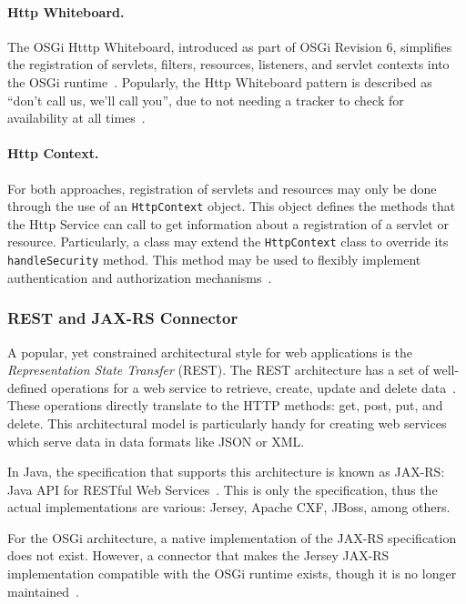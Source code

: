 \documentclass[12pt]{article}
\begin{document}
\paragraph{Http Whiteboard.} The OSGi Htttp Whiteboard, introduced as part of OSGi Revision 6, simplifies the registration of servlets, filters, resources, listeners, and servlet contexts into the OSGi runtime~\cite{httpwhiteboard_01}. Popularly, the Http Whiteboard pattern is described as ``don't call us, we'll call you'', due to not needing a tracker to check for availability at all times~\cite{httpwhiteboard_02}.

\paragraph{Http Context.} For both approaches, registration of servlets and resources may only be done through the use of an \texttt{HttpContext} object. This object defines the methods that the Http Service can call to get information about a registration of a servlet or resource.  Particularly, a class may extend the \texttt{HttpContext} class to override its \texttt{handleSecurity} method. This method may be used to flexibly implement authentication and authorization mechanisms~\cite{httpcontext}.

\subsubsection{REST and JAX-RS Connector}

A popular, yet constrained architectural style for web applications is the \emph{Representation State Transfer} (REST). The REST architecture has a set of well-defined operations for a web service to retrieve, create, update and delete data~\cite{rest_01}. These operations directly translate to the HTTP methods: get, post, put, and delete. This architectural model is particularly handy for creating web services which serve data in data formats like JSON or XML.

In Java, the specification that supports this architecture is known as JAX-RS: Java API for RESTful Web Services~\cite{rest_02}. This is only the specification, thus the actual implementations are various: Jersey, Apache CXF, JBoss, among others.

For the OSGi architecture, a native implementation of the JAX-RS specification does not exist. However, a connector that makes the Jersey JAX-RS implementation compatible with the OSGi runtime exists, though it is no longer maintained~\cite{rest_03}.
\end{document}
